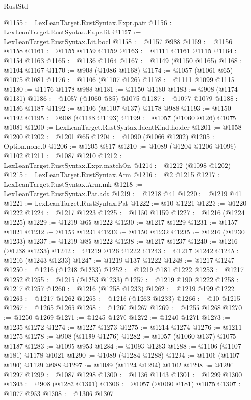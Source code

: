 \begin{lexlean}{RustStd}
\begin{coremodule}
{\begin{coremodule}
{{{{{{{{{{{{{{{{{{{{{{{{{{@1155 := LexLeanTarget.RustSyntax.Expr.pair
@1156 := LexLeanTarget.RustSyntax.Expr.lit
@1157 := LexLeanTarget.RustSyntax.Lit.bool
@1158 := @1157 @988
@1159 := @1156 @1158
@1161 := @1155 @1159 @1159
@1163 := @1111 @1161 @1115
@1164 := @1154 @1163
@1165 := @1136 @1164
@1167 := @1149 (@1150 @1165)
@1168 := @1104 @1167
@1170 := @908 (@1086 @1168)
@1174 := @1057 (@1060 @65) @1075 @1081
@1176 := @1106 (@1107 @126)
@1178 := @1111 @1099 @1115
@1180 := @1176 @1178 @988
@1181 := @1150 @1180
@1183 := @908 (@1174 @1181)
@1186 := @1057 (@1060 @85) @1075
@1187 := @1077 @1079
@1188 := @1186 @1187
@1192 := @1106 (@1107 @137) @1178 @988
@1193 := @1150 @1192
@1195 := @908 (@1188 @1193)
@1199 := @1057 (@1060 @126) @1075 @1081
@1200 := LexLeanTarget.RustSyntax.IdentKind.holder
@1201 := @1058 @1200
@1202 := @1201 @65
@1204 := @1090 (@1066 @1202)
@1205 := Option.none.{0}
@1206 := @1205 @917
@1210 := @1089 (@1204 @1206 @1099) @1102
@1211 := @1087 @1210
@1212 := LexLeanTarget.RustSyntax.Expr.matchOn
@1214 := @1212 (@1098 @1202)
@1215 := LexLeanTarget.RustSyntax.Arm
@1216 := @2 @1215
@1217 := LexLeanTarget.RustSyntax.Arm.mk
@1218 := LexLeanTarget.RustSyntax.Pat.adt
@1219 := @1218 @41
@1220 := @1219 @41
@1221 := LexLeanTarget.RustSyntax.Pat
@1222 := @10 @1221
@1223 := @1220 @1222
@1224 := @1217 @1223
@1225 := @1150 @1159
@1227 := @1216 (@1224 @1225)
@1229 := @1219 @65 @1222
@1230 := @1217 @1229
@1231 := @1157 @1021
@1232 := @1156 @1231
@1233 := @1150 @1232
@1235 := @1216 (@1230 @1233)
@1237 := @1219 @85 @1222
@1238 := @1217 @1237
@1240 := @1216 (@1238 @1233)
@1242 := @1219 @126 @1222
@1243 := @1217 @1242
@1245 := @1216 (@1243 @1233)
@1247 := @1219 @137 @1222
@1248 := @1217 @1247
@1250 := @1216 (@1248 @1233)
@1252 := @1219 @181 @1222
@1253 := @1217 @1252
@1255 := @1216 (@1253 @1233)
@1257 := @1219 @190 @1222
@1258 := @1217 @1257
@1260 := @1216 (@1258 @1233)
@1262 := @1219 @199 @1222
@1263 := @1217 @1262
@1265 := @1216 (@1263 @1233)
@1266 := @10 @1215
@1267 := @1265 @1266
@1268 := @1260 @1267
@1269 := @1255 @1268
@1270 := @1250 @1269
@1271 := @1245 @1270
@1272 := @1240 @1271
@1273 := @1235 @1272
@1274 := @1227 @1273
@1275 := @1214 @1274
@1276 := @1211 @1275
@1278 := @908 (@1199 @1276)
@1282 := @1057 (@1060 @137) @1075 @1187
@1283 := @1095 @953
@1284 := @1093 @1283
@1288 := @1106 (@1107 @181) @1178 @1021
@1290 := @1089 (@1284 @1288)
@1294 := @1106 (@1107 @190) @1129 @988
@1297 := @1089 (@1124 @1294) @1102
@1298 := @1290 @1297
@1299 := @1087 @1298
@1300 := @1136 @1143
@1301 := @1299 @1300
@1303 := @908 (@1282 @1301)
@1306 := @1057 (@1060 @181) @1075
@1307 := @1077 @953
@1308 := @1306 @1307
}}}}}}}}}}}}}}}}}}}}}}}}}}
\end{coremodule}}
\end{coremodule}
\end{lexlean}
